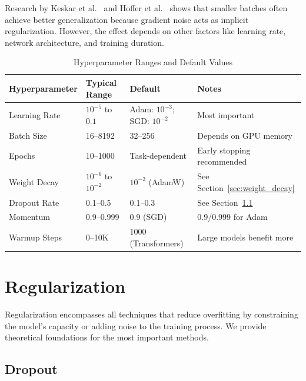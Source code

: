 \begin{note}
Research by Keskar et al.\ \cite{keskar2017largebatch} and Hoffer et al.\ \cite{hoffer2017train} shows that smaller batches often achieve better generalization because gradient noise acts as implicit regularization. However, the effect depends on other factors like learning rate, network architecture, and training duration.
\end{note}

\begin{table}[ht]
    \centering
    \caption{Hyperparameter Ranges and Default Values}
    \begin{tabular}{L{2.8cm} L{3cm} L{3.5cm} L{3cm}}
        \toprule
        \textbf{Hyperparameter} & \textbf{Typical Range} & \textbf{Default} & \textbf{Notes} \\
        \midrule
        Learning Rate & $10^{-5}$ to $0.1$ & Adam: $10^{-3}$; SGD: $10^{-2}$ & Most important \\
        Batch Size & 16--8192 & 32--256 & Depends on GPU memory \\
        Epochs & 10--1000 & Task-dependent & Early stopping recommended \\
        Weight Decay & $10^{-6}$ to $10^{-2}$ & $10^{-2}$ (AdamW) & See Section~\ref{sec:weight_decay} \\
        Dropout Rate & 0.1--0.5 & 0.1--0.3 & See Section~\ref{sec:dropout_theory} \\
        Momentum & 0.9--0.999 & 0.9 (SGD) & 0.9/0.999 for Adam \\
        Warmup Steps & 0--10K & 1000 (Transformers) & Large models benefit more \\
        \bottomrule
    \end{tabular}
\end{table}

\section{Regularization}

Regularization encompasses all techniques that reduce overfitting by constraining the model's capacity or adding noise to the training process. We provide theoretical foundations for the most important methods.

\subsection{Dropout}
\label{sec:dropout_theory}

